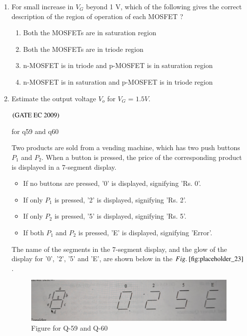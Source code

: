 \documentclass[journal,12pt,onecolumn]{IEEEtran}
\theoremstyle{remark}
\begin{document}
\begin{enumerate}[start=1, label={Q\arabic*.}]
\item For small increase in $V_G$ beyond 1 V, which of the following gives the correct description of the region of operation of each MOSFET ?
\begin{enumerate}
    \item Both the MOSFETs are in saturation region
    \item Both the MOSFETs are in triode region
    \item n-MOSFET is in triode and p-MOSFET is in saturation region
    \item n-MOSFET is in saturation and p-MOSFET is in triode region
\end{enumerate}

\item Estimate the output voltage $V_o$ for $V_G$ = $1.5V$.
\begin{enumerate}
\end{enumerate}
\hfill $\left(\text{GATE EC 2009}\right)$

for q59 and q60

Two products are sold from a vending machine, which has two push buttons $P_1$ and $P_2$. When a button is pressed, the price of the corresponding product is displayed in a 7-segment display.
\begin{itemize}

    \item If no buttons are pressed, '0' is displayed, signifying 'Rs. 0'.

    \item If only $P_1$ is pressed, '2' is displayed, signifying 'Rs. 2'.

    \item If only $P_2$ is pressed, '5' is displayed, signifying 'Rs. 5'.

    \item If both $P_1$ and $P_2$ is pressed, 'E' is displayed, signifying 'Error'.
\end{itemize}

The name of the segments in the 7-segment display, and the glow of the display for '0', '2', '5' and 'E', are shown below in the $\figref{fig:placeholder_23}$. 
\begin{figure}[H]
    \centering
    \includegraphics[width=0.5\columnwidth]{figs/fig_24.jpg}
    \caption{\centering Figure for Q-59 and Q-60}
    \label{fig:placeholder_23}
\end{figure}


\end{enumerate}
\end{document}
